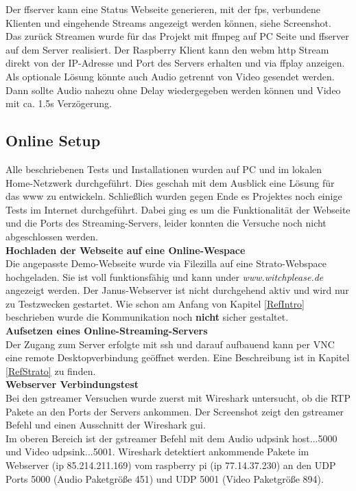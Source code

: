 Der ffserver kann eine Status Webseite generieren, mit der fps, verbundene Klienten und eingehende Streams angezeigt werden können, siehe Screenshot.\\
Das zurück Streamen wurde für das Projekt mit ffmpeg auf PC Seite und ffserver auf dem Server realisiert. Der Raspberry Klient kann den webm http Stream direkt von der IP-Adresse und Port des Servers erhalten und via ffplay anzeigen. Als optionale Lösung könnte auch Audio getrennt von Video gesendet werden. Dann sollte Audio nahezu ohne Delay wiedergegeben werden können und Video mit ca. 1.5s Verzögerung.

\subsection{Online Setup}
Alle beschriebenen Tests und Installationen wurden auf PC und im lokalen Home-Netzwerk durchgeführt. Dies geschah mit dem Ausblick eine Lösung für das www zu entwickeln. Schließlich wurden gegen Ende es Projektes noch einige Tests im Internet durchgeführt. Dabei ging es um die Funktionalität der Webseite und die Ports des Streaming-Servers, leider konnten die Versuche noch nicht abgeschlossen werden.\\ 

\textbf{Hochladen der Webseite auf eine Online-Wespace}\\
Die angepasste Demo-Webseite wurde via Filezilla auf eine Strato-Webspace hochgeladen. Sie ist voll funktionsfähig und kann under \textit{www.witchplease.de} angezeigt werden. Der Janus-Webserver ist nicht durchgehend aktiv und wird nur zu Testzwecken gestartet. Wie schon am Anfang von Kapitel \ref{RefIntro} beschrieben wurde die Kommunikation noch \textbf{nicht} sicher gestaltet.\\

\textbf{Aufsetzen eines Online-Streaming-Servers}\\
Der Zugang zum Server erfolgte mit ssh und darauf aufbauend kann per VNC eine remote Desktopverbindung geöffnet werden. Eine Beschreibung ist in Kapitel \ref{RefStrato} zu finden. \\

\textbf{Webserver Verbindungstest}\\
Bei den gstreamer Versuchen wurde zuerst mit Wireshark untersucht, ob die RTP Pakete an den Ports der Servers ankommen. Der Screenshot zeigt den gstreamer Befehl und einen Ausschnitt der Wireshark gui.\\
Im oberen Bereich ist der gstreamer Befehl mit dem Audio udpsink host...5000 und Video udpsink...5001. Wireshark detektiert ankommende Pakete im Webserver (ip 85.214.211.169) vom raspberry pi (ip 77.14.37.230) an den UDP Ports 5000 (Audio Paketgröße 451) und UDP 5001 (Video Paketgröße 894).\\

